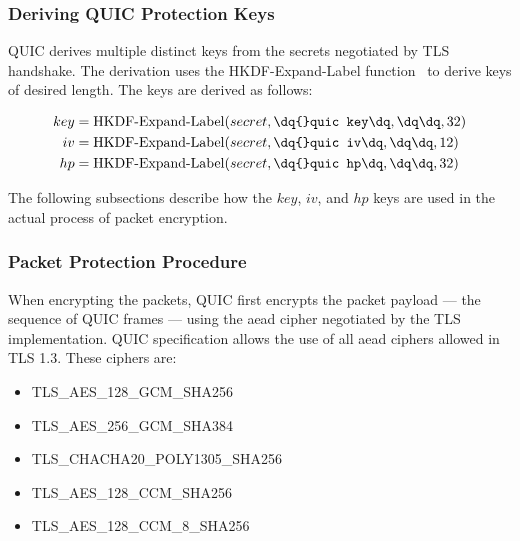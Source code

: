\subsubsection{Deriving QUIC Protection Keys}\label{sec:02-encryption-key-derivation}

QUIC derives multiple distinct keys from the secrets negotiated by TLS handshake. The derivation
uses the HKDF-Expand-Label function~\cite{rfc5869} to derive keys of desired length. The keys are
derived as follows:

\begin{equation*}
  \begin{split}
    key & = \operatorname{HKDF-Expand-Label}(secret, \texttt{\dq{}quic key\dq}, \texttt{\dq\dq}, 32) \\
    iv & = \operatorname{HKDF-Expand-Label}(secret, \texttt{\dq{}quic iv\dq}, \texttt{\dq\dq}, 12) \\
    hp & = \operatorname{HKDF-Expand-Label}(secret, \texttt{\dq{}quic hp\dq}, \texttt{\dq\dq}, 32) \\
  \end{split}
\end{equation*}

The following subsections describe how the $key$, $iv$, and $hp$ keys are used in the actual process
of packet encryption.

\subsubsection{Packet Protection Procedure}

When encrypting the packets, QUIC first encrypts the packet payload --- the sequence of QUIC frames
--- using the \gls{aead} cipher negotiated by the TLS implementation. QUIC specification allows the
use of all \gls{aead} ciphers allowed in TLS 1.3. These ciphers are:

\begin{itemize}

  \item TLS\_AES\_128\_GCM\_SHA256

  \item TLS\_AES\_256\_GCM\_SHA384

  \item TLS\_CHACHA20\_POLY1305\_SHA256

  \item TLS\_AES\_128\_CCM\_SHA256

  \item TLS\_AES\_128\_CCM\_8\_SHA256

\end{itemize}



